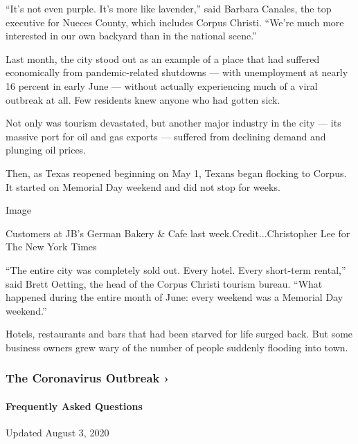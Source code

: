 ``It's not even purple. It's more like lavender,'' said Barbara Canales,
the top executive for Nueces County, which includes Corpus Christi.
``We're much more interested in our own backyard than in the national
scene.''

Last month, the city stood out as an example of a place that had
suffered economically from pandemic-related shutdowns --- with
unemployment at nearly 16 percent in early June --- without actually
experiencing much of a viral outbreak at all. Few residents knew anyone
who had gotten sick.

Not only was tourism devastated, but another major industry in the city
--- its massive port for oil and gas exports --- suffered from declining
demand and plunging oil prices.

Then, as Texas reopened beginning on May 1, Texans began flocking to
Corpus. It started on Memorial Day weekend and did not stop for weeks.

Image

Customers at JB's German Bakery \& Cafe last week.Credit...Christopher
Lee for The New York Times

``The entire city was completely sold out. Every hotel. Every short-term
rental,'' said Brett Oetting, the head of the Corpus Christi tourism
bureau. ``What happened during the entire month of June: every weekend
was a Memorial Day weekend.''

Hotels, restaurants and bars that had been starved for life surged back.
But some business owners grew wary of the number of people suddenly
flooding into town.

\href{https://www.nytimes3xbfgragh.onion/news-event/coronavirus?action=click\&pgtype=Article\&state=default\&region=MAIN_CONTENT_3\&context=storylines_faq}{}

\hypertarget{the-coronavirus-outbreak-}{%
\subsubsection{The Coronavirus Outbreak
›}\label{the-coronavirus-outbreak-}}

\hypertarget{frequently-asked-questions}{%
\paragraph{Frequently Asked
Questions}\label{frequently-asked-questions}}

Updated August 3, 2020

